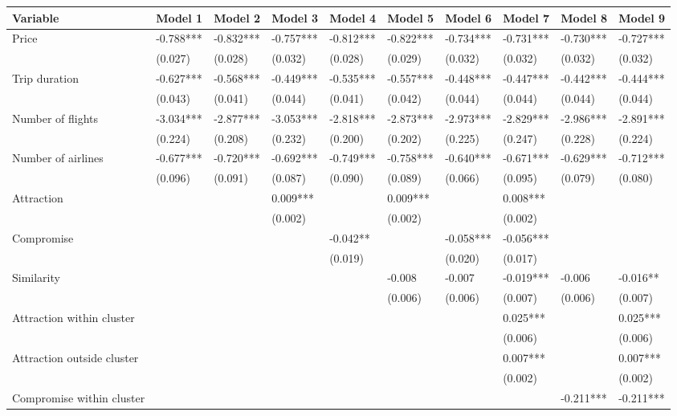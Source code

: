 \documentclass[a4paper,12pt]{article}
\begin{document}
\newpage
\clearpage
\begin{table}
    \centering
    \scriptsize
    \begin{tabular}{p{5.3cm}*{9}{p{1.3cm}}}
        \toprule
    Variable & Model 1 & Model 2 & Model 3 & Model 4 & Model 5 & Model 6 & Model 7 & Model 8 & Model 9 \\
    \midrule
    Price & -0.788*** & -0.832*** & -0.757*** & -0.812*** & -0.822*** & -0.734*** & -0.731*** & -0.730*** & -0.727*** \\
    & (0.027) & (0.028) & (0.032) & (0.028) & (0.029) & (0.032) & (0.032) & (0.032) & (0.032) \\
    Trip duration & -0.627*** & -0.568*** & -0.449*** & -0.535*** & -0.557*** & -0.448*** & -0.447*** & -0.442*** & -0.444*** \\
    & (0.043) & (0.041) & (0.044) & (0.041) & (0.042) & (0.044) & (0.044) & (0.044) & (0.044) \\
    Number of flights & -3.034*** & -2.877*** & -3.053*** & -2.818*** & -2.873*** & -2.973*** & -2.829*** & -2.986*** & -2.891*** \\
    & (0.224) & (0.208) & (0.232) & (0.200) & (0.202) & (0.225) & (0.247) & (0.228) & (0.224) \\
    Number of airlines & -0.677*** & -0.720*** & -0.692*** & -0.749*** & -0.758*** & -0.640*** & -0.671*** & -0.629*** & -0.712*** \\
    & (0.096) & (0.091) & (0.087) & (0.090) & (0.089) & (0.066) & (0.095) & (0.079) & (0.080) \\
    Attraction & & & 0.009*** & & 0.009*** & & 0.008*** & & \\
    & & & (0.002) & & (0.002) & & (0.002) & & \\
    Compromise & & & & -0.042** & & -0.058*** & -0.056*** & & \\
    & & & & (0.019) & & (0.020) & (0.017) & & \\
    Similarity & & & & & -0.008 & -0.007 & -0.019*** & -0.006 & -0.016** \\
    & & & & & (0.006) & (0.006) & (0.007) & (0.006) & (0.007) \\
    Attraction within cluster & & & & & & & 0.025*** & & 0.025*** \\
    & & & & & & & (0.006) & & (0.006) \\
    Attraction outside cluster & & & & & & & 0.007*** & & 0.007*** \\
    & & & & & & & (0.002) & & (0.002) \\
    Compromise within cluster & & & & & & & & -0.211*** & -0.211*** \\

\end{tabular}
\end{table}
\end{document}
